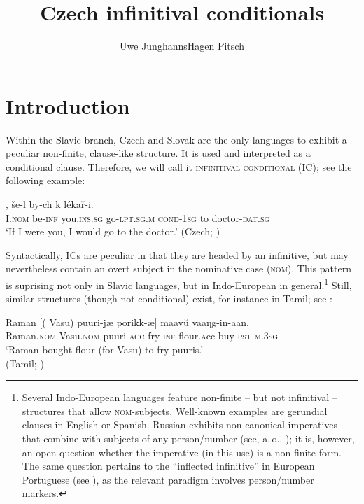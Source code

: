 \documentclass[output=paper,colorlinks,citecolor=brown,
modfonts,newtxmath
]{langscibook}
\title{Czech infinitival conditionals}
\author{%
 Uwe Junghanns\affiliation{University of Göttingen}\lastand Hagen Pitsch\affiliation{University of Göttingen}
}
\begin{document}
\maketitle

\section{Introduction}

Within the Slavic branch, Czech and Slovak are the only languages to exhibit a peculiar non-finite, clause-like structure. It is used and interpreted as a conditional clause. Therefore, we will call it \textsc{infinitival conditional} (IC); see the following example:

\ea\label{ex:start}
, še-l by-ch k lékař-i.\\ 
     {} I.\textsc{nom} be-\textsc{inf} you.\textsc{ins.sg} go-\textsc{lpt.sg.m} \textsc{cond-1sg} to doctor-\textsc{dat.sg}\\ 
\glt `If I were you, I would go to the doctor.' \hfill (Czech; \citealt[683]{Travnicek1951})
\z

\noindent Syntactically, ICs are peculiar in that they are headed by an infinitive, but may nevertheless contain an overt subject in the nominative case (\textsc{nom}). This pattern is suprising not only in Slavic languages, but in Indo-European in general.\footnote{Several Indo-European languages feature non-finite -- but not infinitival -- structures that allow \textsc{nom}-subjects. Well-known examples are gerundial clauses in English or Spanish. Russian exhibits non-canonical imperatives that combine with subjects of any person/number (see, a.\,o., \citealt{Xrakovskij2009}); it is, however, an open question whether the imperative (in this use) is a non-finite form. The same question pertains to the ``inflected infinitive'' in European Portuguese (see \citealt{Raposo1987}), as the relevant paradigm involves person/number markers.} Still, similar structures (though not conditional) exist, for instance in Tamil; see :

\ea\label{ex:Tamil}
\gll Raman {[(}\hspace{-2pt} Vasu) {puuri-jæ} {porikk-æ}] maav\u{u} vaaŋg-in-aan.\\
	Raman.\textsc{nom} {} Vasu.\textsc{nom} puuri-\textsc{acc} fry-\textsc{inf} flour.{\textsc acc} buy-\textsc{pst-m.3sg}\\ 
\glt `Raman bought flour (for Vasu) to fry puuris.' \\ \hfill (Tamil; \citealt[467]{McFaddenSundaresan2018})
\z
\end{document}
